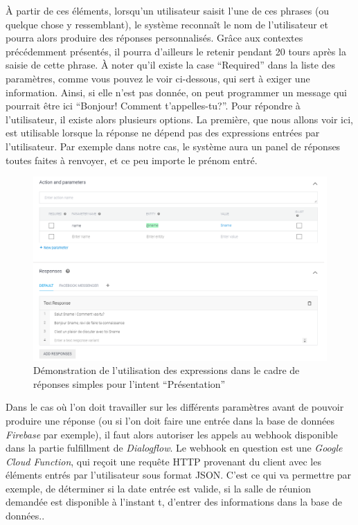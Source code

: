 \documentclass[stage2a]{tnreport} %
\begin{document}
\`{A} partir de ces éléments, lorsqu'un utilisateur saisit l'une de ces phrases (ou quelque chose y ressemblant), le système reconnaît le nom de l'utilisateur et pourra alors produire des réponses personnalisés. Grâce aux contextes précédemment présentés, il pourra d'ailleurs le retenir pendant 20 tours après la saisie de cette phrase. \`{A} noter qu'il existe la case ``Required'' dans la liste des paramètres, comme vous pouvez le voir ci-dessous, qui sert à exiger une information. Ainsi, si elle n'est pas donnée, on peut programmer un message qui pourrait être ici ``Bonjour! Comment t'appelles-tu?''. Pour répondre à l'utilisateur, il existe alors plusieurs options. La première, que nous allons voir ici, est utilisable lorsque la réponse ne dépend pas des expressions entrées par l'utilisateur. Par exemple dans notre cas, le système aura un panel de réponses toutes faites à renvoyer, et ce peu importe le prénom entré.  \\
\begin{figure}[h!]
    \centering
    \includegraphics[width=\textwidth]{figures/responses1.PNG}
    \caption{Démonstration de l'utilisation des expressions dans le cadre de réponses simples pour l'intent ``Présentation''}
    \label{responses1}
\end{figure}

\vspace{\linewidth}
Dans le cas où l'on doit travailler sur les différents paramètres avant de pouvoir produire une réponse (ou si l'on doit faire une entrée dans la base de données \emph{Firebase} par exemple), il faut alors autoriser les appels au webhook disponible dans la partie fulfillment de \emph{Dialogflow}. Le webhook en question est une \emph{Google Cloud Function}, qui reçoit une requête HTTP provenant du client avec les éléments entrés par l'utilisateur sous format JSON. C'est ce qui va permettre par exemple, de déterminer si la date entrée est valide, si la salle de réunion demandée est disponible à l'instant t, d'entrer des informations dans la base de données.. \\
\end{document}
